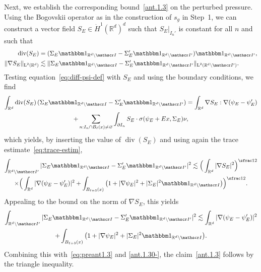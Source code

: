\documentclass[10pt]{amsart}
\let\mathcal\mathscr
\let\mathds\mathbbm
\theoremstyle{plain}
\theoremstyle{definition}
\newcommand{\R}{\mathbb R}
\newcommand{\Ic}{\mathcal I}
\newcommand{\Ld}{\operatorname{L}}
\newcommand{\Div}{{\operatorname{div}}}
\begin{document}
Next, we establish the corresponding bound~\eqref{ant.1.3} on the perturbed pressure.
Using the Bogovskii operator as in the construction of $s_g$ in Step~1, we can construct a vector field $S_E\in\dot H^1(\R^d)^d$ such that
$S_E|_{I_n'}$ is constant for all $n$ and such that
\begin{align*}
\Div (S_E)&=(\Sigma_E\mathds1_{\R^d\setminus\Ic}-\Sigma_E'\mathds1_{\R^d\setminus\Ic'})\mathds1_{\R^d\setminus\Ic'},\\
\|\nabla S_E\|_{\Ld^2(\R^d)}&\lesssim \|\Sigma_E\mathds1_{\R^d\setminus\Ic}-\Sigma_E'\mathds1_{\R^d\setminus\Ic'}\|_{\Ld^2(\R^d\setminus\Ic')}.
\end{align*}
Testing equation~\eqref{eq:diff-psi-def} with $S_E$ and using the boundary conditions, we find
\begin{multline*}
\int_{\R^d}\Div(S_E)\,(\Sigma_E\mathds1_{\R^d\setminus\Ic}-\Sigma_E'\mathds1_{\R^d\setminus\Ic'})=\int_{\R^d}\nabla S_E:\nabla(\psi_E-\psi_E')\\
+\sum_{n:I_n\cap B_\ell(x)\ne\varnothing}\int_{\partial I_n}S_E\cdot\sigma(\psi_E+Ex,\Sigma_E)\nu,
\end{multline*}
which yields, by inserting the value of $\Div (S_E)$ and using again the trace estimate~\eqref{eq:trace-estim},
\begin{multline*}
\int_{\R^d\setminus\Ic'}|\Sigma_E\mathds1_{\R^d\setminus\Ic}-\Sigma_E'\mathds1_{\R^d\setminus\Ic'}|^2\lesssim\Big(\int_{\R^d}|\nabla S_E|^2\Big)^{\sfrac12}\\
\times\Big(\int_{\R^d}|\nabla(\psi_E-\psi_E')|^2+\int_{B_{\ell+3}(x)}\big(1+|\nabla\psi_E|^2+|\Sigma_E|^2\mathds1_{\R^d\setminus\Ic}\big)\Big)^{\sfrac12}.
\end{multline*}
Appealing to the bound on the norm of $\nabla S_E$, this yields
\begin{multline*}
\int_{\R^d\setminus\Ic'}|\Sigma_E\mathds1_{\R^d\setminus\Ic}-\Sigma_E'\mathds1_{\R^d\setminus\Ic'}|^2\lesssim 
\int_{\R^d}|\nabla(\psi_E-\psi_E')|^2\\
+\int_{B_{\ell+3}(x)}\big(1+|\nabla\psi_E|^2+|\Sigma_E|^2\mathds1_{\R^d\setminus\Ic}\big).
\end{multline*}
Combining this with~\eqref{eq:preant1.3} and \eqref{ant.1.30-}, the claim~\eqref{ant.1.3} follows by the triangle inequality.
\end{document}
